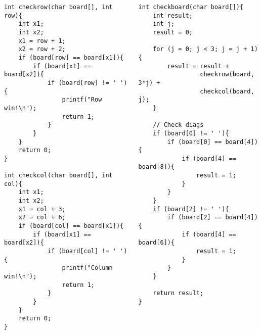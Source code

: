 \documentclass{plt}
\begin{document}
\begin{frame}[fragile]
\begin{columns}
\begin{column}{0.5\textwidth}
\fontsize{7pt}{7pt}\selectfont
\begin{verbatim}
int checkrow(char board[], int row){
    int x1;
    int x2;
    x1 = row + 1;
    x2 = row + 2;
    if (board[row] == board[x1]){
        if (board[x1] == board[x2]){
            if (board[row] != ' '){
                printf("Row win!\n");
                return 1;
            }
        }
    }
    return 0;
}

int checkcol(char board[], int col){
    int x1;
    int x2;
    x1 = col + 3;
    x2 = col + 6;
    if (board[col] == board[x1]){
        if (board[x1] == board[x2]){
            if (board[col] != ' '){
                printf("Column win!\n");
                return 1;
            }
        }
    }
    return 0;
}
\end{verbatim}
\end{column}
\begin{column}{0.5\textwidth}
\fontsize{7pt}{7pt}\selectfont
\begin{verbatim}
int checkboard(char board[]){
    int result;
    int j;
    result = 0;

    for (j = 0; j < 3; j = j + 1){
        result = result +
                 checkrow(board, 3*j) +
                 checkcol(board, j);
    }

    // Check diags
    if (board[0] != ' '){
        if (board[0] == board[4]){
            if (board[4] == board[8]){
                result = 1;
            }
        }
    }
    if (board[2] != ' '){
        if (board[2] == board[4]){
            if (board[4] == board[6]){
                result = 1;
            }
        }
    }

    return result;
}
\end{verbatim}
\end{column}
\end{columns}
\end{frame}
\end{document}
